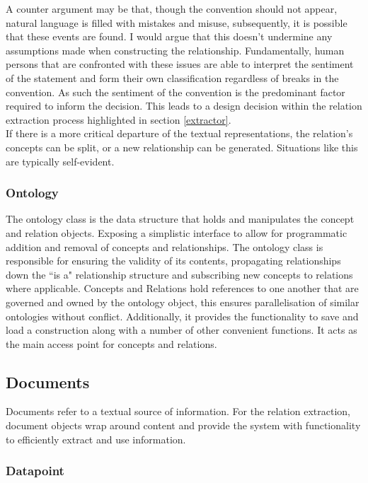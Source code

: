 \documentclass[12pt]{article} %
\begin{document}
A counter argument may be that, though the convention should not appear, natural language is filled with mistakes and misuse, subsequently, it is possible that these events are found. I would argue that this doesn’t undermine any assumptions made when constructing the relationship. Fundamentally, human persons that are confronted with these issues are able to interpret the sentiment of the statement and form their own classification regardless of breaks in the convention. As such the sentiment of the convention is the predominant factor required to inform the decision. This leads to a design decision within the relation extraction process highlighted in section \ref{extractor}.\\

If there is a more critical departure of the textual representations, the relation's concepts can be split, or a new relationship can be generated. Situations like this are typically self-evident.

\subsubsection{Ontology}

The ontology class is the data structure that holds and manipulates the concept and relation objects. Exposing a simplistic interface to allow for programmatic addition and removal of concepts and relationships. The ontology class is responsible for ensuring the validity of its contents, propagating relationships down the ``is a" relationship structure and subscribing new concepts to relations where applicable. Concepts and Relations hold references to one another that are governed and owned by the ontology object, this ensures parallelisation of similar ontologies without conflict. Additionally, it provides the functionality to save and load a construction along with a number of other convenient functions. It acts as the main access point for concepts and relations.

\subsection{Documents}

Documents refer to a textual source of information. For the relation extraction, document objects wrap around content and provide the system with functionality to efficiently extract and use information.

\subsubsection{Datapoint}
\end{document}
